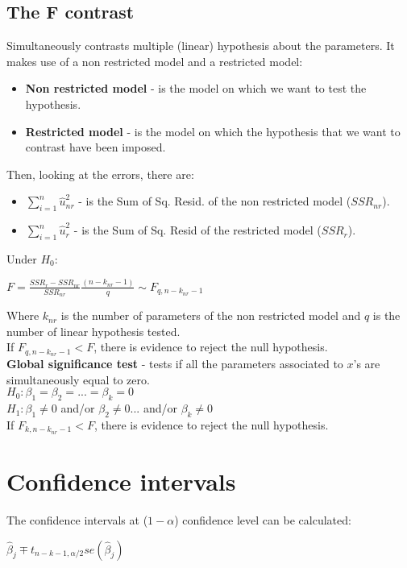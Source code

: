 \documentclass[10pt, a4paper, landscape]{extarticle}
\begin{document}
\begin{multicols}{3}
	\subsection*{The F contrast}
		Simultaneously contrasts multiple (linear) hypothesis about the parameters. It makes use of a non restricted model and a restricted model:
		\begin{itemize}[leftmargin=*]
			\item \textbf{Non restricted model} - is the model on which we want to test the hypothesis.
			\item \textbf{Restricted model} - is the model on which the hypothesis that we want to contrast have been imposed.
		\end{itemize}
		Then, looking at the errors, there are:
		\begin{itemize}[leftmargin=*]
			\item \textbf{$\sum_{i=1}^n \hat{u}_{nr}^2$} - is the Sum of Sq. Resid. of the non restricted model ($SSR_{nr}$).
			\item \textbf{$\sum_{i=1}^n \hat{u}_r^2$} - is the Sum of Sq. Resid of the restricted model ($SSR_r$).
		\end{itemize}
		Under $H_0$:
		\begin{center}
			$F = \frac{SSR_r - SSR_{nr}}{SSR_{nr}} \frac{(n-k_{nr}-1)}{q} \sim F_{q, n-k_{nr}-1}$
		\end{center}
		Where $k_{nr}$ is the number of parameters of the non restricted model and $q$ is the number of linear hypothesis tested.
		\\ If $F_{q, n-k_{nr}-1} < F$, there is evidence to reject the null hypothesis.
		\\ \textbf{Global significance test} - tests if all the parameters associated to $x$'s are simultaneously equal to zero.
		\\ $H_0: \beta_1 = \beta_2 = ... = \beta_k = 0$
		\\ $H_1: \beta_1 \neq 0$ and/or $\beta_2 \neq 0 ...$ and/or $\beta_k \neq 0$
		\\ If $F_{k, n-k_{nr}-1} < F$, there is evidence to reject the null hypothesis.

\section*{Confidence intervals}
	The confidence intervals at ($1 - \alpha$) confidence level can be calculated:
	\begin{center}
		$\hat{\beta}_j \mp t_{n-k-1, \alpha/2} se(\hat{\beta}_j)$
	\end{center}


\end{multicols}
\end{document}
